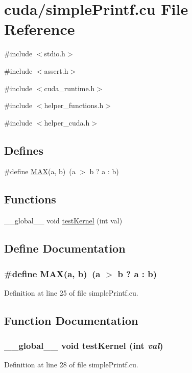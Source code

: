 \hypertarget{simplePrintf_8cu}{
\section{cuda/simplePrintf.cu File Reference}
\label{simplePrintf_8cu}
}
{\ttfamily \#include $<$stdio.h$>$}\par
{\ttfamily \#include $<$assert.h$>$}\par
{\ttfamily \#include $<$cuda\_\-runtime.h$>$}\par
{\ttfamily \#include $<$helper\_\-functions.h$>$}\par
{\ttfamily \#include $<$helper\_\-cuda.h$>$}\par
\subsection*{Defines}
\begin{DoxyCompactItemize}
\item 
\#define \hyperlink{simplePrintf_8cu_afa99ec4acc4ecb2dc3c2d05da15d0e3f}{MAX}(a, b)~(a $>$ b ? a : b)
\end{DoxyCompactItemize}
\subsection*{Functions}
\begin{DoxyCompactItemize}
\item 
\_\-\_\-global\_\-\_\- void \hyperlink{simplePrintf_8cu_a6e9fe17e0d6f904d708c6f3e8a65c888}{testKernel} (int val)
\end{DoxyCompactItemize}


\subsection{Define Documentation}
\hypertarget{simplePrintf_8cu_afa99ec4acc4ecb2dc3c2d05da15d0e3f}{
\subsubsection[{MAX}]{\setlength{\rightskip}{0pt plus 5cm}\#define MAX(a, \/  b)~(a $>$ b ? a : b)}}
\label{simplePrintf_8cu_afa99ec4acc4ecb2dc3c2d05da15d0e3f}


Definition at line 25 of file simplePrintf.cu.

\subsection{Function Documentation}
\hypertarget{simplePrintf_8cu_a6e9fe17e0d6f904d708c6f3e8a65c888}{
\subsubsection[{testKernel}]{\setlength{\rightskip}{0pt plus 5cm}\_\-\_\-global\_\-\_\- void testKernel (int {\em val})}}
\label{simplePrintf_8cu_a6e9fe17e0d6f904d708c6f3e8a65c888}


Definition at line 28 of file simplePrintf.cu.